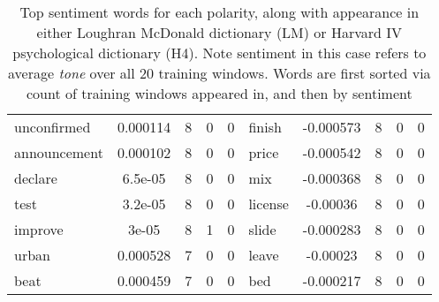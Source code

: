 \documentclass[ oneside,tikz,%
                    author={Joshua Felmeden},
                    degree={MEng},
                     title={Semantic Analysis of Financial Headlines Based on Realised Stock Returns},
                  subtitle={Research}]{dissertation}
\begin{document}
\begin{table}
\begin{tabular}{lcccclcccc}
unconfirmed & 0.000114 & 8 & 0 & 0 & finish & -0.000573 & 8 & 0 & 0 \\
announcement & 0.000102 & 8 & 0 & 0 & price & -0.000542 & 8 & 0 & 0 \\
declare & 6.5e-05 & 8 & 0 & 0 & mix & -0.000368 & 8 & 0 & 0 \\
test & 3.2e-05 & 8 & 0 & 0 & license & -0.00036 & 8 & 0 & 0 \\
improve & 3e-05 & 8 & 1 & 0 & slide & -0.000283 & 8 & 0 & 0 \\
urban & 0.000528 & 7 & 0 & 0 & leave & -0.00023 & 8 & 0 & 0 \\
beat & 0.000459 & 7 & 0 & 0 & bed & -0.000217 & 8 & 0 & 0 \\
\bottomrule
\end{tabular}
\caption[Sentiment word list for unigrams]{Top sentiment words for each polarity, along with appearance in either Loughran McDonald dictionary (LM) or Harvard IV psychological dictionary (H4). Note sentiment in this case refers to average \textit{tone} over all 20 training windows. Words are first sorted via count of training windows appeared in, and then by sentiment}
\end{table}
\end{document}

